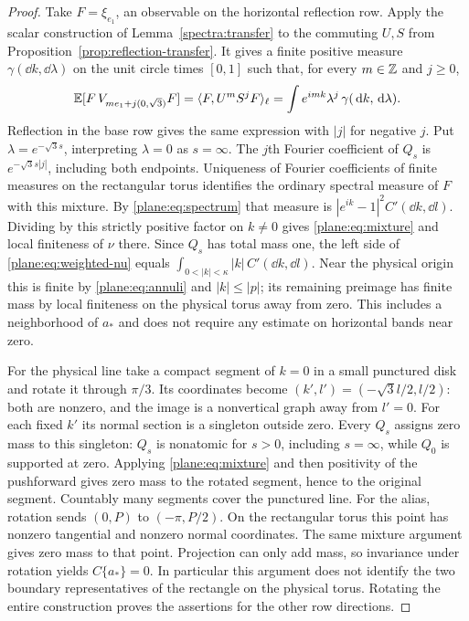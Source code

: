 \begin{proof}
Take $F=\xi_{e_1}$, an observable on the horizontal reflection row.
Apply the scalar construction of Lemma~\ref{spectra:transfer} to the
commuting $U,S$ from Proposition~\ref{prop:reflection-transfer}.
It gives a finite positive measure $\gamma(\dd k,\dd\lambda)$ on the
unit circle times $[0,1]$ such that, for every $m\in\mathbb Z$ and $j\ge0$,
\[
 \mathbb E[F\,V_{me_1+j(0,\sqrt3)}F]
   =\langle F,U^mS^jF\rangle_\ell
   =\int e^{imk}\lambda^j\,\gamma(\,\mathrm d k,\,\mathrm d\lambda).
\]
Reflection in the base row gives the same expression with $|j|$ for
negative $j$.  Put $\lambda=e^{-\sqrt3s}$, interpreting $\lambda=0$ as
$s=\infty$.  The $j$th Fourier coefficient of $Q_s$ is
$e^{-\sqrt3s|j|}$, including both endpoints.  Uniqueness of Fourier
coefficients of finite measures on the rectangular torus identifies
the ordinary spectral measure of $F$ with this mixture.
By \eqref{plane:eq:spectrum} that measure is
$|e^{ik}-1|^2 C'(\dd k,\dd l)$.  Dividing by this strictly positive
factor on $k\ne0$ gives \eqref{plane:eq:mixture} and local finiteness
of $\nu$ there.
Since $Q_s$ has total mass one, the left side of
\eqref{plane:eq:weighted-nu} equals
$\int_{0<|k|<\kappa}|k|\,C'(\dd k,\dd l)$.
Near the physical origin this is finite by \eqref{plane:eq:annuli} and
$|k|\le|p|$; its remaining preimage has finite mass by local finiteness
on the physical torus away from zero.  This includes a neighborhood of
$a_*$ and does not require any estimate on horizontal bands near zero.

For the physical line take a compact segment of $k=0$ in a small
punctured disk and rotate it through $\pi/3$.  Its coordinates become
$(k',l')=(-\sqrt3l/2,l/2)$: both are nonzero, and the image is a
nonvertical graph away from $l'=0$.  For each fixed $k'$ its normal
section is a singleton outside zero.  Every $Q_s$ assigns zero mass
to this singleton: $Q_s$ is nonatomic for $s>0$, including $s=\infty$,
while $Q_0$ is supported at zero.  Applying \eqref{plane:eq:mixture}
and then positivity of the pushforward gives zero mass to the rotated
segment, hence to the original segment.  Countably many segments cover
the punctured line.
For the alias, rotation sends $(0,P)$ to $(-\pi,P/2)$.
On the rectangular torus this point has nonzero tangential and nonzero
normal coordinates.  The same mixture argument gives zero mass to that
point.  Projection can only add mass, so invariance under rotation yields
$C\{a_*\}=0$.  In particular this argument does not identify the two
boundary representatives of the rectangle on the physical torus.
Rotating the entire construction proves the assertions for the other
row directions.
\end{proof}

